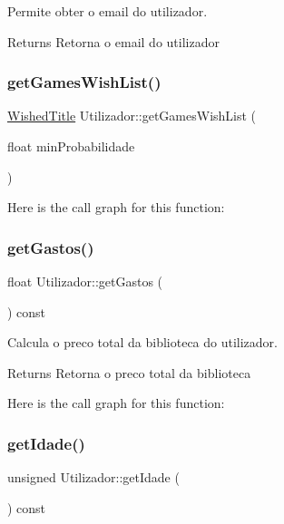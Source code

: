 Permite obter o email do utilizador. 

\begin{DoxyReturn}{Returns}
Retorna o email do utilizador 
\end{DoxyReturn}
\mbox{\label{class_utilizador_a9b80c93b8e8f7716e4ab77b2e1b47071}} 
\subsubsection{\texorpdfstring{get\+Games\+Wish\+List()}{getGamesWishList()}}
{\footnotesize\ttfamily \mbox{\hyperlink{class_wished_title}{Wished\+Title}} Utilizador\+::get\+Games\+Wish\+List (\begin{DoxyParamCaption}\item[{float}]{min\+Probabilidade }\end{DoxyParamCaption})}

Here is the call graph for this function\+:
\mbox{\label{class_utilizador_a2fc6ea78068d43766a6bc344a3059f61}} 
\subsubsection{\texorpdfstring{get\+Gastos()}{getGastos()}}
{\footnotesize\ttfamily float Utilizador\+::get\+Gastos (\begin{DoxyParamCaption}{ }\end{DoxyParamCaption}) const}



Calcula o preco total da biblioteca do utilizador. 

\begin{DoxyReturn}{Returns}
Retorna o preco total da biblioteca 
\end{DoxyReturn}
Here is the call graph for this function\+:
\mbox{\label{class_utilizador_adff93f098f9512263fcbd1cdadf20855}} 
\subsubsection{\texorpdfstring{get\+Idade()}{getIdade()}}
{\footnotesize\ttfamily unsigned Utilizador\+::get\+Idade (\begin{DoxyParamCaption}{ }\end{DoxyParamCaption}) const}



